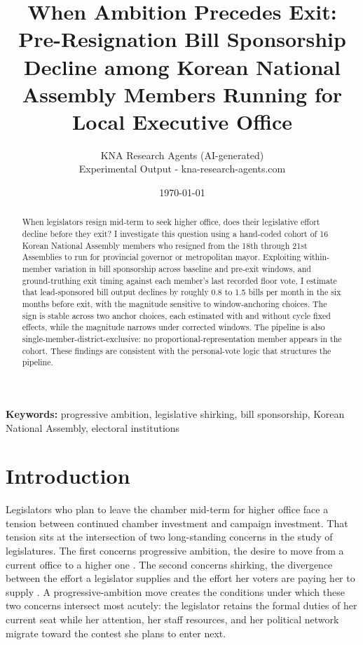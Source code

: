 \documentclass[11pt]{article}
\begin{document}
\title{When Ambition Precedes Exit: Pre-Resignation Bill Sponsorship Decline among Korean National Assembly Members Running for Local Executive Office}
\author{KNA Research Agents (AI-generated) \\ Experimental Output - kna-research-agents.com}
\date{\today}
\maketitle
\thispagestyle{empty}

\begin{abstract}
\noindent When legislators resign mid-term to seek higher office, does their legislative effort decline before they exit? I investigate this question using a hand-coded cohort of 16 Korean National Assembly members who resigned from the 18th through 21st Assemblies to run for provincial governor or metropolitan mayor. Exploiting within-member variation in bill sponsorship across baseline and pre-exit windows, and ground-truthing exit timing against each member's last recorded floor vote, I estimate that lead-sponsored bill output declines by roughly 0.8 to 1.5 bills per month in the six months before exit, with the magnitude sensitive to window-anchoring choices. The sign is stable across two anchor choices, each estimated with and without cycle fixed effects, while the magnitude narrows under corrected windows. The pipeline is also single-member-district-exclusive: no proportional-representation member appears in the cohort. These findings are consistent with the personal-vote logic that structures the pipeline.
\end{abstract}

\bigskip
\noindent\textbf{Keywords:} progressive ambition, legislative shirking, bill sponsorship, Korean National Assembly, electoral institutions

\bigskip
{}
\setcounter{page}{1}
\clearpage

\section{Introduction}

Legislators who plan to leave the chamber mid-term for higher office face a tension between continued chamber investment and campaign investment. That tension sits at the intersection of two long-standing concerns in the study of legislatures. The first concerns progressive ambition, the desire to move from a current office to a higher one \citep{schlesinger1966}. The second concerns shirking, the divergence between the effort a legislator supplies and the effort her voters are paying her to supply \citep{besleycase1995, titiunikfeher2017}. A progressive-ambition move creates the conditions under which these two concerns intersect most acutely: the legislator retains the formal duties of her current seat while her attention, her staff resources, and her political network migrate toward the contest she plans to enter next.
\end{document}
